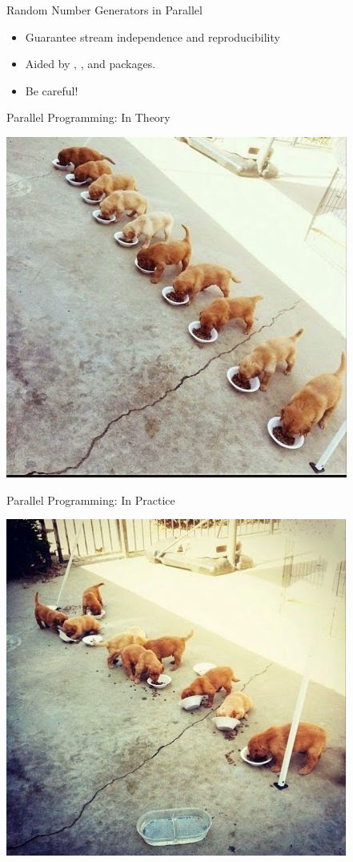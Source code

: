 \begin{frame}
  \begin{block}{Random Number Generators in Parallel}
    \begin{itemize}
    \item Guarantee stream independence and reproducibility
    \item Aided by , , and  packages.
    \item Be careful!
    \end{itemize}
  \end{block}
\end{frame}

\begin{frame}{Parallel Programming:  In Theory}
  \begin{center}
    \includegraphics[scale=.7]{../common/pics/parallel/mt_theory}
  \end{center}
\end{frame}

\begin{frame}{Parallel Programming:  In Practice}
  \begin{center}
    \includegraphics[scale=.7]{../common/pics/parallel/mt_practice}
  \end{center}
\end{frame}
